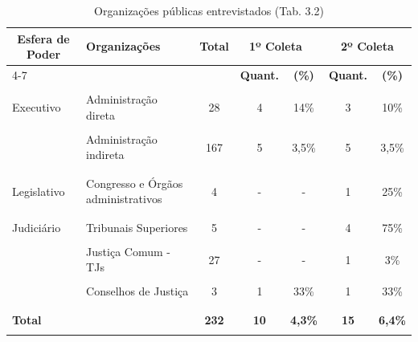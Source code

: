 


\begin{center}
\fontsize{4}{4}\selectfont
\begin{longtable}{llccccc}
\caption{Organizações públicas entrevistados (Tab. 3.2)}
\label{tab:org2019}\\
\hline

\multicolumn{1}{c}{\multirow{2}{*}{\textbf{Esfera de Poder}}} & \multirow{2}{*}{\textbf{Organizações}} & \multicolumn{1}{l}{\multirow{2}{*}{\textbf{Total}}} & \multicolumn{2}{c}{\textbf{1º Coleta~\cite{Alves2021}}} & \multicolumn{2}{c}{\textbf{2º Coleta}} \\ \cline{4-7} 
\multicolumn{1}{c}{} &  & \multicolumn{1}{c}{} & \multicolumn{1}{c}{\textbf{Quant.}} & \multicolumn{1}{c}{\textbf{(\%)}} & \multicolumn{1}{c}{\textbf{Quant.}} & \multicolumn{1}{c}{\textbf{(\%)}} \\ \hline
\endfirsthead
%
\endhead
%
\\
Executivo & Administração direta & 28 & 4 & 14\% & 3 & 10\% \\ \\
 & Administração indireta & 167 & 5 & 3,5\% & 5 & 3,5\% \\ \\\hline
 \\
Legislativo & Congresso e Órgãos administrativos & 4 & - & - & 1 & 25\%\\ \\ \hline \\
Judiciário & Tribunais Superiores & 5 & - & - & 4 & 75\% \\ \\
& Justiça Comum - TJs & 27 & - & - & 1 & 3\% \\ \\
 & Conselhos de Justiça & 3 & 1 & 33\% & 1 & 33\% \\ \\\hline  \\
\textbf{Total} & \textbf{} & \textbf{232} & \textbf{10} & \textbf{4,3\%} & \textbf{15} & \textbf{6,4\%} \\ \\ \hline
\end{longtable}
\end{center}
